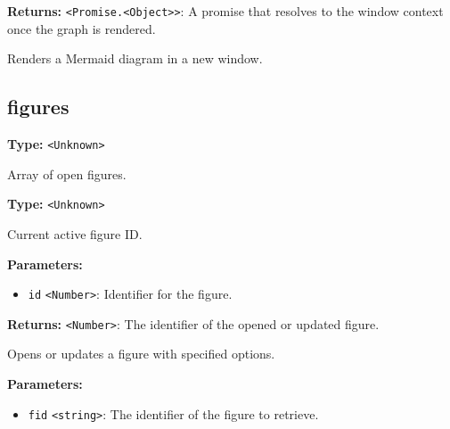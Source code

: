 \documentclass[12pt,a4paper]{article}
\begin{document}
\noindent \textbf{Returns:} \texttt{<Promise.<Object>>}: A promise that resolves to the window context once the graph is rendered.

\noindent Renders a Mermaid diagram in a new window.


\subsection{figures}
\vspace{5mm}
\noindent {}\vspace{4mm}


\noindent \textbf{Type:} \texttt{<Unknown>}

\noindent Array of open figures.

\vspace{5mm}
\noindent {}\vspace{4mm}


\noindent \textbf{Type:} \texttt{<Unknown>}

\noindent Current active figure ID.

\vspace{5mm}
\noindent {}


\noindent \textbf{Parameters:}
\begin{itemize}
  \item \texttt{id} \texttt{<Number>}: Identifier for the figure.
\end{itemize}

\noindent \textbf{Returns:} \texttt{<Number>}: The identifier of the opened or updated figure.

\noindent Opens or updates a figure with specified options.

\vspace{5mm}
\noindent {}


\noindent \textbf{Parameters:}
\begin{itemize}
  \item \texttt{fid} \texttt{<string>}: The identifier of the figure to retrieve.
\end{itemize}
\end{document}
